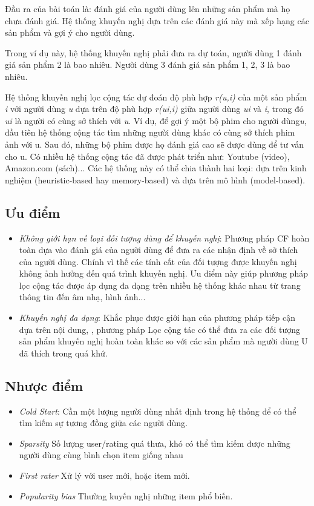 \documentclass{report}
\begin{document}
Đầu ra của bài toán là: đánh giá của người dùng lên những sản phẩm mà họ
chưa đánh giá. Hệ thống khuyến nghị dựa trên các đánh giá này mà xếp hạng các sản
phẩm và gợi ý cho người dùng.

Trong ví dụ này, hệ thống khuyến nghị phải đưa ra dự toán, người dùng 1 đánh
giá sản phẩm 2 là bao nhiêu. Người dùng 3 đánh giá sản phẩm 1, 2, 3 là bao nhiêu.


Hệ thống khuyến nghị lọc cộng tác dự đoán độ phù hợp \emph{r(u,i)} của một sản
phẩm \emph{i} với người dùng \emph{u} dựa trên độ phù hợp \emph{r(ui,i)} giữa người dùng \emph{ui} và \emph{i}, trong đó \emph{ui} là người có cùng sở thích với \emph{u}. Ví dụ, để gợi ý một bộ phim cho người dùng\emph{u}, đầu
tiên hệ thống cộng tác tìm những người dùng khác có cùng sở thích phim ảnh với {u}.
Sau đó, những bộ phim được họ đánh giá cao sẽ được dùng để tư vấn cho u. Có nhiều
hệ thống cộng tác đã được phát triển như: Youtube (video), Amazon.com (sách)... Các
hệ thống này có thể chia thành hai loại: dựa trên kinh nghiệm (heuristic-based hay
memory-based) và dựa trên mô hình (model-based).


\subsection{Ưu điểm}
\begin{itemize}
	\item \emph{Không giới hạn về loại đối tượng dùng để khuyến nghị}: Phương pháp CF hoàn toàn dựa vào đánh giá của người dùng để đưa ra các nhận định về sở thích của người dùng. Chính vì thế các tính cất của đối tượng được khuyến nghị không ảnh hưởng đến quá trình khuyến nghị. Ưu điểm này giúp phương pháp lọc cộng tác được áp dụng đa dạng trên nhiều hệ thống khác nhau từ trang thông tin đến âm nhạ, hình ảnh...
	\item \emph{Khuyến nghị đa dạng}: Khắc phục được giới hạn của phương pháp tiếp cận dựa trên nội dung, , phương pháp Lọc cộng tác có thể đưa ra các đối tượng sản phẩm khuyến nghị hoàn toàn khác so với các sản phẩm mà
	người dùng U đã thích trong quá khứ.
	\end{itemize}
\subsection{Nhược điểm}
\begin{itemize}
	\item \emph{Cold Start}: Cần một lượng người dùng nhất định trong hệ thống để có thể tìm kiếm sự tương đồng giữa các người dùng.
	\item \emph{Sparsity} Số lượng user/rating quá thưa, khó có thể tìm kiếm được những người dùng cùng bình chọn item giống nhau
	\item \emph{First rater} Xử lý với user mới, hoặc item mới.
	\item \emph{Popularity bias} Thường kuyến nghị những item phổ biến.
	\end{itemize}
\end{document}
